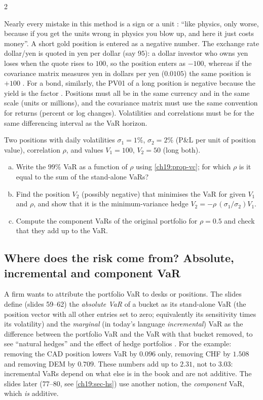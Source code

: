 \begin{paracol}{2}
\begin{finance}\label{ch19:fin-signs}
Nearly every mistake in this method is a sign or a unit : ``like physics, only worse, because if you get the units wrong in physics you blow up, and here it just costs money''. A short gold position is entered as a negative number. The exchange rate dollar/yen is quoted in yen per dollar (say $95$): a dollar investor who owns yen loses when the quote rises to $100$, so the position enters as $-100$, whereas if the covariance matrix measures yen in dollars per yen ($0.0105$) the same position is $+100$ . For a bond, similarly, the PV01 of a long position is negative because the yield is the factor . Positions must all be in the same currency and in the same scale (units or millions), and the covariance matrix must use the same convention for returns (percent or log changes). Volatilities and correlations must be for the same differencing interval as the VaR horizon.
\end{finance}

\begin{exercise}
Two positions with daily volatilities $\sigma_1=1\%$, $\sigma_2=2\%$ (P\&L per unit of position value), correlation $\rho$, and values $V_1=100$, $V_2=50$ (long both).
\begin{enumerate}[(a)]
  \item Write the $99\%$ VaR as a function of $\rho$ using \cref{ch19:prop-vc}; for which $\rho$ is it equal to the sum of the stand-alone VaRs?
  \item Find the position $V_2$ (possibly negative) that minimises the VaR for given $V_1$ and $\rho$, and show that it is the minimum-variance hedge $V_2=-\rho\,(\sigma_1/\sigma_2)V_1$.
  \item Compute the component VaRs of the original portfolio for $\rho=0.5$ and check that they add up to the VaR.
\end{enumerate}
\end{exercise}

\subsection{Where does the risk come from? Absolute, incremental and component VaR}
A firm wants to attribute the portfolio VaR to desks or positions. The slides define (slides 59--62) the \emph{absolute VaR} of a bucket as its stand-alone VaR (the position vector with all other entries set to zero; equivalently its sensitivity times its volatility) and the \emph{marginal} (in today's language \emph{incremental}) VaR as the difference between the portfolio VaR and the VaR with that bucket removed, to see ``natural hedges'' and the effect of hedge portfolios . For the example: removing the CAD position lowers VaR by $0.096$ only, removing CHF by $1.508$ and removing DEM by $0.709$. These numbers add up to $2.31$, not to $3.03$: incremental VaRs depend on what else is in the book and are not additive. The slides later (77--80, see \cref{ch19:sec-hs}) use another notion, the \emph{component} VaR, which \emph{is} additive.


\end{paracol}
